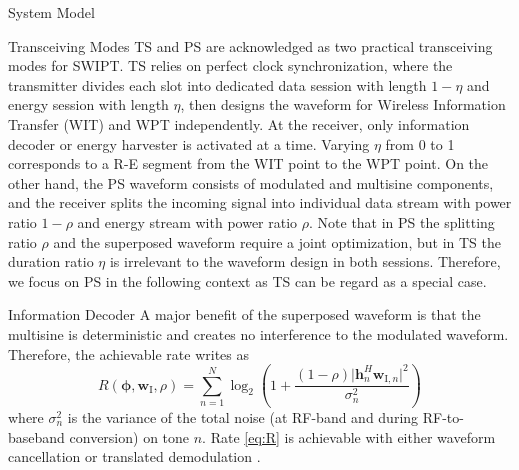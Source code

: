 \documentclass[journal]{IEEEtran}
\begin{document}
\begin{section}{System Model}
		\begin{subsection}{Transceiving Modes}
			TS and PS are acknowledged as two practical transceiving modes for SWIPT. TS relies on perfect clock synchronization, where the transmitter divides each slot into dedicated data session with length $1 - \eta$ and energy session with length $\eta$, then designs the waveform for Wireless Information Transfer (WIT) and WPT independently. At the receiver, only information decoder or energy harvester is activated at a time. Varying $\eta$ from \num{0} to \num{1} corresponds to a R-E segment from the WIT point to the WPT point. On the other hand, the PS waveform consists of modulated and multisine components, and the receiver splits the incoming signal into individual data stream with power ratio $1 - \rho$ and energy stream with power ratio $\rho$. Note that in PS the splitting ratio $\rho$ and the superposed waveform require a joint optimization, but in TS the duration ratio $\eta$ is irrelevant to the waveform design in both sessions. Therefore, we focus on PS in the following context as TS can be regard as a special case.
		\end{subsection}


		\begin{subsection}{Information Decoder}
			A major benefit of the superposed waveform is that the multisine is deterministic and creates no interference to the modulated waveform. Therefore, the achievable rate writes as
			\begin{equation}\label{eq:R}
				R(\boldsymbol{\phi},\boldsymbol{w}_{\mathrm{I}},\rho) = \sum_{n=1}^N{\log_2\left(1+\frac{(1-\rho)\lvert \boldsymbol{h}_{n}^H\boldsymbol{w}_{\mathrm{I},n} \rvert^2}{\sigma_n^2}\right)}
			\end{equation}
			where $\sigma_n^2$ is the variance of the total noise (at RF-band and during RF-to-baseband conversion) on tone $n$. Rate \eqref{eq:R} is achievable with either waveform cancellation or translated demodulation \cite{Clerckx2018b}.
		\end{subsection}



\end{section}
\end{document}
